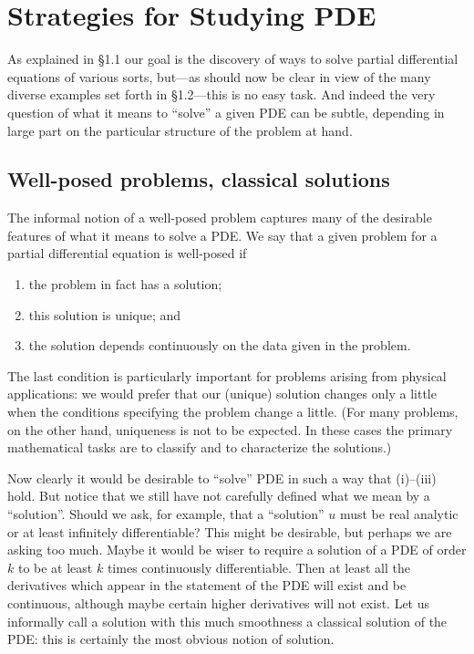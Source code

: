 \section{Strategies for Studying PDE}
\label{sec:1-3}

As explained in \S1.1 our goal is the discovery of ways to solve partial differential equations of various sorts, but---as should now be clear in view of the many diverse examples set forth in \S1.2---this is no easy task. And indeed the very question of what it means to ``solve'' a given PDE can be subtle, depending in large part on the particular structure of the problem at hand.

\subsection{Well-posed problems, classical solutions} The informal notion of a well-posed problem captures many of the desirable features of what it means to solve a PDE. We say that a given problem for a partial differential equation is well-posed if \begin{enumerate}[label=(\roman*)]
\item the problem in fact has a solution;
\item this solution is unique; and
\item the solution depends continuously on the data given in the problem.
\end{enumerate} \par\Needspace{65mm}

The last condition is particularly important for problems arising from physical applications: we would prefer that our (unique) solution changes only a little when the conditions specifying the problem change a little. (For many problems, on the other hand, uniqueness is not to be expected. In these cases the primary mathematical tasks are to classify and to characterize the solutions.)

Now clearly it would be desirable to ``solve'' PDE in such a way that (i)--(iii) hold. But notice that we still have not carefully defined what we mean by a ``solution''. Should we ask, for example, that a ``solution'' $u$ must be real analytic or at least infinitely differentiable? This might be desirable, but perhaps we are asking too much. Maybe it would be wiser to require a solution of a PDE of order $k$ to be at least $k$ times continuously differentiable. Then at least all the derivatives which appear in the statement of the PDE will exist and be continuous, although maybe certain higher derivatives will not exist. Let us informally call a solution with this much smoothness a classical solution of the PDE: this is certainly the most obvious notion of solution.

